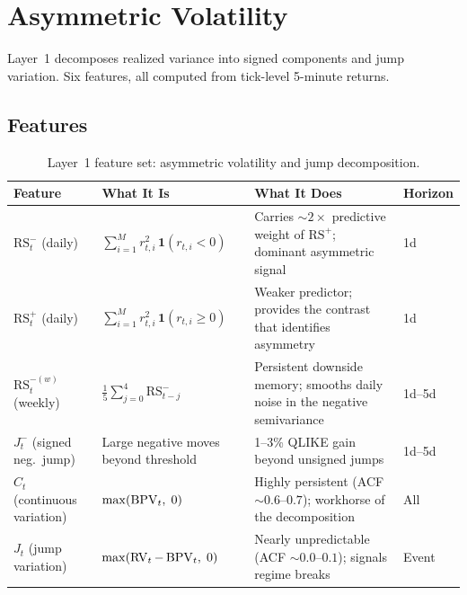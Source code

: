 \chapter{Asymmetric Volatility}
\label{ch:asymmetry-jumps}

Layer~1 decomposes realized variance into signed components and jump variation.
Six features, all computed from tick-level 5-minute returns.

\section{Features}
\label{sec:asymmetry-features}

\begin{table}[htbp]
\centering
\caption{Layer~1 feature set: asymmetric volatility and jump decomposition.}
\label{tab:asymmetry-features}
\small
\begin{tabular}{@{}p{2.8cm}p{4.2cm}p{4.8cm}l@{}}
\toprule
\textbf{Feature} & \textbf{What It Is} & \textbf{What It Does} & \textbf{Horizon} \\
\midrule
$\mathrm{RS}_t^{-}$ (daily) &
  $\displaystyle\sum_{i=1}^{M} r_{t,i}^{2}\,\mathbf{1}(r_{t,i} < 0)$ &
  Carries ${\sim}2\times$ predictive weight of $\mathrm{RS}^{+}$; dominant asymmetric signal \citep{PattonSheppard2015} &
  1d \\[10pt]
$\mathrm{RS}_t^{+}$ (daily) &
  $\displaystyle\sum_{i=1}^{M} r_{t,i}^{2}\,\mathbf{1}(r_{t,i} \geq 0)$ &
  Weaker predictor; provides the contrast that identifies asymmetry &
  1d \\[10pt]
$\mathrm{RS}_t^{-(w)}$ (weekly) &
  $\displaystyle\frac{1}{5}\sum_{j=0}^{4} \mathrm{RS}_{t-j}^{-}$ &
  Persistent downside memory; smooths daily noise in the negative semivariance &
  1d--5d \\[10pt]
$J_t^{-}$ (signed neg.\ jump) &
  Large negative moves beyond threshold &
  1--3\% QLIKE gain beyond unsigned jumps \citep{ABD2007} &
  1d--5d \\[10pt]
$C_t$ (continuous variation) &
  $\max(\operatorname{BPV}_t,\; 0)$ &
  Highly persistent (ACF ${\sim}0.6$--$0.7$); workhorse of the decomposition \citep{BNS2004} &
  All \\[10pt]
$J_t$ (jump variation) &
  $\max(\operatorname{RV}_t - \operatorname{BPV}_t,\; 0)$ &
  Nearly unpredictable (ACF ${\sim}0.0$--$0.1$); signals regime breaks &
  Event \\
\bottomrule
\end{tabular}
\end{table}


